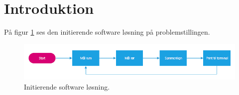 \section{Introduktion}
På figur \ref{initierende_figur} ses den initierende software løsning på problemstillingen.
\begin{figure}[h!]
  \centering
  \includegraphics[width=1\textwidth]{figures/Fase1software.png}
  \caption{Initierende software løsning.}
  \label{initierende_figur}
\end{figure}
